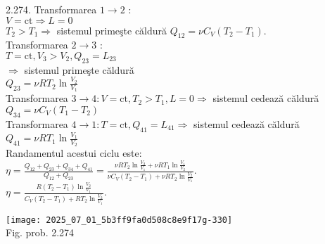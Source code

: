2.274. Transformarea $1 \rightarrow 2$ :\\ $V=\mathrm{ct} \Rightarrow L=0$\\ $T_{2}>T_{1} \Rightarrow$ sistemul primeşte căldură $Q_{12}=\nu C_{V}\left(T_{2}-T_{1}\right)$.\\ Transformarea $2 \rightarrow 3$ :\\ $T=\mathrm{ct}, V_{3}>V_{2}, Q_{23}=L_{23}$\\ $\Rightarrow$ sistemul primeşte căldură\\ $Q_{23}=\nu R T_{2} \ln \frac{V_{2}}{V_{1}}$\\ Transformarea $3 \rightarrow 4: V=\mathrm{ct}, T_{2}>T_{1}, L=0 \Rightarrow$ sistemul cedează căldură\\ $Q_{34}=\nu C_{V}\left(T_{1}-T_{2}\right)$\\ Transformarea $4 \rightarrow 1: T=\mathrm{ct}, Q_{41}=L_{41} \Rightarrow$ sistemul cedează căldură\\ $Q_{41}=\nu R T_{1} \ln \frac{V_{1}}{V_{2}}$\\ Randamentul acestui ciclu este:\\ $\eta=\frac{Q_{12}+Q_{23}+Q_{34}+Q_{41}}{Q_{12}+Q_{23}}=\frac{\nu R T_{2} \ln \frac{V_{2}}{V_{1}}+\nu R T_{1} \ln \frac{V_{1}}{V_{2}}}{\nu C_{V}\left(T_{2}-T_{1}\right)+\nu R T_{2} \ln \frac{V_{2}}{V_{1}}}$.\\ $\eta=\frac{R\left(T_{2}-T_{1}\right) \ln \frac{V_{2}}{V_{1}}}{C_{V}\left(T_{2}-T_{1}\right)+R T_{2} \ln \frac{V_{2}}{V_{1}}} $.\\ \begin{center} \texttt{[image: 2025\_07\_01\_5b3ff9fa0d508c8e9f17g-330]}\\ Fig. prob. 2.274 \end{center}\\

